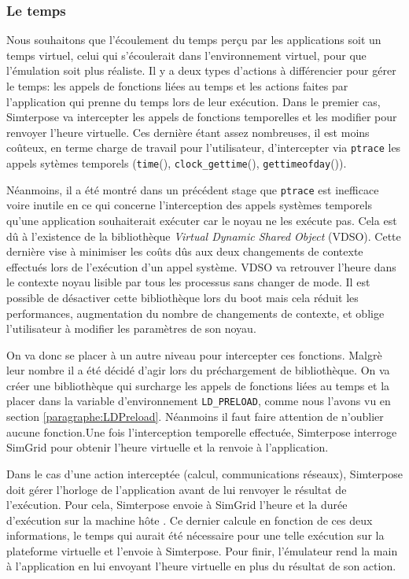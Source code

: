 \subsubsection{Le temps}

Nous souhaitons que l'écoulement du temps perçu par les applications soit un
temps virtuel, celui qui s'écoulerait dans l'environnement virtuel, pour que
l'émulation soit plus réaliste. Il y a deux types d'actions à différencier pour
gérer le temps: les appels de fonctions liées au temps et les actions faites par
l'application qui prenne du temps lors de leur exécution. Dans le premier cas,
Simterpose va intercepter les appels de fonctions temporelles et les modifier
pour renvoyer l'heure virtuelle. Ces dernière étant assez nombreuses, il est
moins coûteux, en terme charge de travail pour l'utilisateur, d'intercepter via
\texttt{ptrace} les appels sytèmes temporels (\texttt{time}(),
\texttt{clock\_gettime}(), \texttt{gettimeofday}()).

Néanmoins, il a été montré dans un précédent stage
\citep{CHLOE:Emulationapplicationdistribuees} que \texttt{ptrace} est inefficace
voire inutile en ce qui concerne l'interception des appels systèmes temporels
qu'une application souhaiterait exécuter car le noyau ne les exécute pas. Cela
est dû à l'existence de la bibliothèque \textit{Virtual Dynamic Shared Object}
(VDSO). Cette dernière vise à minimiser les coûts dûs aux deux changements de
contexte effectués lors de l'exécution d'un appel système. VDSO va retrouver
l'heure dans le contexte noyau lisible par tous les processus sans changer de
mode. Il est possible de désactiver cette bibliothèque lors du boot mais cela
réduit les performances, augmentation du nombre de changements de contexte, et
oblige l'utilisateur à modifier les paramètres de son noyau.

On va donc se placer à un autre niveau pour intercepter ces fonctions. Malgrè
leur nombre il a été décidé d'agir lors du préchargement de bibliothèque. On va
créer une bibliothèque qui surcharge les appels de fonctions liées au temps et
la placer dans la variable d'environnement \texttt{LD\_PRELOAD}, comme nous
l'avons vu en section \ref{paragraphe:LDPreload}. Néanmoins il faut faire
attention de n'oublier aucune fonction.Une fois l'interception temporelle
effectuée, Simterpose interroge SimGrid pour obtenir l'heure virtuelle et la
renvoie à l'application.

Dans le cas d'une action interceptée (calcul, communications réseaux),
Simterpose doit gérer l'horloge de l'application avant de lui renvoyer le
résultat de l'exécution. Pour cela, Simterpose envoie à SimGrid l'heure et la
durée d'exécution sur la machine hôte . Ce dernier calcule en fonction de ces
deux informations, le temps qui aurait été nécessaire pour une telle exécution
sur la plateforme virtuelle et l'envoie à Simterpose. Pour finir, l'émulateur
rend la main à l'application en lui envoyant l'heure virtuelle en plus du
résultat de son action.
